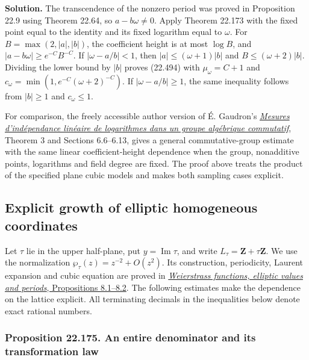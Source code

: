 \documentclass[
  11pt,
  a4paper,
]{article}
\begin{document}
\textbf{Solution.} The transcendence of the nonzero period was proved in
Proposition 22.9 using Theorem 22.64, so \(a-b\omega\ne0\). Apply
Theorem 22.173 with the fixed point equal to the identity and its fixed
logarithm equal to \(\omega\). For \(B=\max(2,|a|,|b|)\), the
coefficient height is at most \(\log B\), and
\(|a-b\omega|\ge e^{-C}B^{-C}\). If \(|\omega-a/b|<1\), then
\(|a|\le(\omega+1)|b|\) and \(B\le(\omega+2)|b|\). Dividing the lower
bound by \(|b|\) proves (22.494) with \(\mu_\omega=C+1\) and
\(c_\omega=\min(1,e^{-C}(\omega+2)^{-C})\). If \(|\omega-a/b|\ge1\), the
same inequality follows from \(|b|\ge1\) and \(c_\omega\le1\).

For comparison, the freely accessible author version of É. Gaudron's
\href{https://lmbp.uca.fr/~gaudron/art4.pdf}{\emph{Mesures
d'indépendance linéaire de logarithmes dans un groupe algébrique
commutatif}}, Theorem 3 and Sections 6.6--6.13, gives a general
commutative-group estimate with the same linear coefficient-height
dependence when the group, nonadditive points, logarithms and field
degree are fixed. The proof above treats the product of the specified
plane cubic models and makes both sampling cases explicit.

\subsection{Explicit growth of elliptic homogeneous
coordinates}\label{explicit-growth-of-elliptic-homogeneous-coordinates}

Let \(\tau\) lie in the upper half-plane, put
\(y=\operatorname{Im}\tau\), and write
\(L_\tau=\mathbf Z+\tau\mathbf Z\). We use the normalization
\(\wp_\tau(z)=z^{-2}+O(z^2)\). Its construction, periodicity, Laurent
expansion and cubic equation are proved in
\href{https://kokunoyumeto.github.io/open-math-courses-public/courses/TR-TRANS/TR-TRANS-08.html\#1-a-lattice-and-its-weierstrass-function}{\emph{Weierstrass
functions, elliptic values and periods}, Propositions 8.1--8.2}. The
following estimates make the dependence on the lattice explicit. All
terminating decimals in the inequalities below denote exact rational
numbers.

\subsubsection{Proposition 22.175. An entire denominator and its
transformation
law}\label{proposition-22.175.-an-entire-denominator-and-its-transformation-law}
\end{document}
